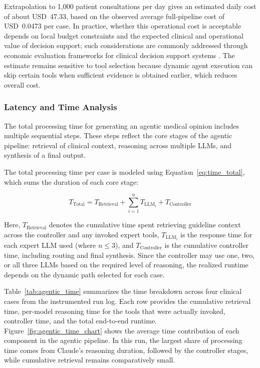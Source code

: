 \documentclass[preprint,12pt]{elsarticle}
\begin{document}
Extrapolation to 1,000 patient consultations per day gives an estimated daily cost of about USD~47.33, based on the observed average full-pipeline cost of USD~0.0473 per case. In practice, whether this operational cost is acceptable depends on local budget constraints and the expected clinical and operational value of decision support; such considerations are commonly addressed through economic evaluation frameworks for clinical decision support systems \cite{White2023}. The estimate remains sensitive to tool selection because dynamic agent execution can skip certain tools when sufficient evidence is obtained earlier, which reduces overall cost.


\subsubsection{Latency and Time Analysis}

The total processing time for generating an agentic medical opinion includes multiple sequential steps. These steps reflect the core stages of the agentic pipeline: retrieval of clinical context, reasoning across multiple LLMs, and synthesis of a final output. 

The total processing time per case is modeled using Equation~\ref{eq:time_total}, which sums the duration of each core stage:

\begin{equation}
T_{\text{Total}} = T_{\text{Retrieval}} + \sum_{i=1}^{n} T_{\text{LLM}_i} + T_{\text{Controller}}
\label{eq:time_total}
\end{equation}

Here, \( T_{\text{Retrieval}} \) denotes the cumulative time spent retrieving guideline context across the controller and any invoked expert tools, \( T_{\text{LLM}_i} \) is the response time for each expert LLM used (where \( n \leq 3 \)), and \( T_{\text{Controller}} \) is the cumulative controller time, including routing and final synthesis. Since the controller may use one, two, or all three LLMs based on the required level of reasoning, the realized runtime depends on the dynamic path selected for each case. 

Table~\ref{tab:agentic_time} summarizes the time breakdown across four clinical cases from the instrumented run log. Each row provides the cumulative retrieval time, per-model reasoning time for the tools that were actually invoked, controller time, and the total end-to-end runtime. Figure~\ref{fig:agentic_time_chart} shows the average time contribution of each component in the agentic pipeline. In this run, the largest share of processing time comes from Claude's reasoning duration, followed by the controller stages, while cumulative retrieval remains comparatively small.
\end{document}
